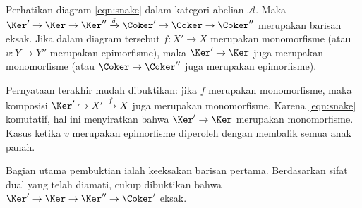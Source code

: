 \begin{teorema}\label{prop:snake-lemma}
	Perhatikan diagram \eqref{eqn:snake} dalam kategori abelian
	$\mathcal{A}$. Maka
	$\Ker' \to \Ker \to \Ker'' \xrightarrow{\delta} \Coker' \to \Coker \to \Coker''$
	merupakan barisan eksak. Jika dalam diagram tersebut $f: X' \to X$
	merupakan monomorfisme (atau $v: Y \to Y''$ merupakan epimorfisme), maka
	$\Ker' \to \Ker$ juga merupakan monomorfisme (atau
	$\Coker \to \Coker''$ juga merupakan epimorfisme).
\end{teorema}
\begin{bukti}
	Pernyataan terakhir mudah dibuktikan: jika $f$ merupakan monomorfisme,
	maka komposisi $\Ker' \hookrightarrow X' \xrightarrow{f} X$ juga
	merupakan monomorfisme. Karena \eqref{eqn:snake} komutatif, hal ini
	menyiratkan bahwa $\Ker' \to \Ker$ merupakan monomorfisme. Kasus ketika
	$v$ merupakan epimorfisme diperoleh dengan membalik semua anak panah.

	Bagian utama pembuktian ialah keeksakan barisan pertama.
	Berdasarkan sifat dual yang telah diamati, cukup dibuktikan bahwa
	$\Ker' \to \Ker \to \Ker'' \to \Coker'$ eksak.
	

\end{bukti}
